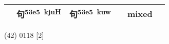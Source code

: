 \documentclass[14pt,a4paper]{scrartcl}
\begin{document}
\begin{longtable}[c]{@{}llllll@{}}
\begin{minipage}[t]{0.14\columnwidth}
\strut\end{minipage} &
\begin{minipage}[t]{0.14\columnwidth}\raggedright\strut
句\textsuperscript{53e5~kjuH}
\strut\end{minipage} &
\begin{minipage}[t]{0.14\columnwidth}\raggedright\strut
句\textsuperscript{53e5~kuw}
\strut\end{minipage} &
\begin{minipage}[t]{0.14\columnwidth}\raggedright\strut
\strut\end{minipage} &
\begin{minipage}[t]{0.14\columnwidth}\raggedright\strut
mixed
\strut\end{minipage}\tabularnewline
\bottomrule
\end{longtable}

(42) 0118 {[}2{]}
\end{document}

